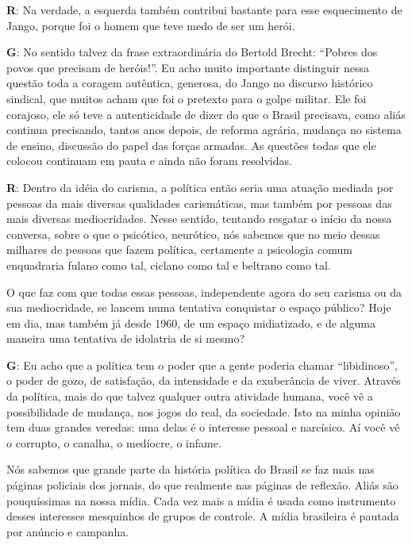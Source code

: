 \textbf{R}: Na verdade, a esquerda também contribui bastante para esse
esquecimento de Jango, porque foi o homem que teve medo de ser um herói.

 

\textbf{G}: No sentido talvez da frase extraordinária do Bertold Brecht:
``Pobres dos povos que precisam de heróis!''. Eu acho muito importante
distinguir nessa questão toda a coragem autêntica, generosa, do Jango no
discurso histórico sindical, que muitos acham que foi o pretexto para o
golpe militar. Ele foi corajoso, ele só teve a autenticidade de dizer do
que o Brasil precisava, como aliás continua precisando, tantos anos
depois, de reforma agrária, mudança no sistema de ensino, discussão do
papel das forças armadas. As questões todas que ele colocou continuam em
pauta e ainda não foram resolvidas.

 

\textbf{R}: Dentro da idéia do carisma, a política então seria uma
atuação mediada por pessoas da mais diversas qualidades carismáticas,
mas também por pessoas das mais diversas mediocridades. Nesse sentido,
tentando resgatar o início da nossa conversa, sobre o que o psicótico,
neurótico, nós sabemos que no meio dessas milhares de pessoas que fazem
política, certamente a psicologia comum enquadraria fulano como tal,
ciclano como tal e beltrano como tal.

 

O que faz com que todas essas pessoas, independente agora do seu carisma
ou da sua mediocridade, se lancem numa tentativa conquistar o espaço
público? Hoje em dia, mas também já desde 1960, de um espaço
midiatizado, e de alguma maneira uma tentativa de idolatria de si mesmo?

 

\textbf{G}: Eu acho que a política tem o poder que a gente poderia
chamar ``libidinoso'', o poder de gozo, de satisfação, da intensidade e
da exuberância de viver. Através da política, mais do que talvez
qualquer outra atividade humana, você vê a possibilidade de mudança, nos
jogos do real, da sociedade. Isto na minha opinião tem duas grandes
veredas: uma delas é o interesse pessoal e narcísico. Aí você vê o
corrupto, o canalha, o medíocre, o infame.

 

Nós sabemos que grande parte da história política do Brasil se faz mais
nas páginas policiais dos jornais, do que realmente nas páginas de
reflexão. Aliás são pouquíssimas na nossa mídia. Cada vez mais a mídia é
usada como instrumento desses interesses mesquinhos de grupos de
controle. A mídia brasileira é pautada por anúncio e campanha. 

